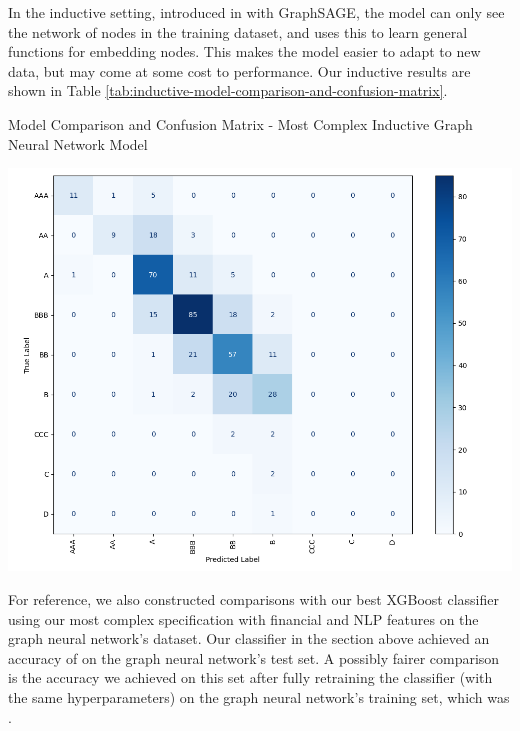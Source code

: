 \documentclass{article}[11pt]
\begin{document}
    In the inductive setting, introduced in \citep{hamilton_inductive_2018} with GraphSAGE, the model can only see the network of nodes in the training dataset, and uses this to learn general functions for embedding nodes. This makes the model easier to adapt to new data, but may come at some cost to performance. Our inductive results are shown in Table \ref{tab:inductive-model-comparison-and-confusion-matrix}.

    \begin{table}[h!]
        \centering
        \caption{Model Comparison and Confusion Matrix - Most Complex Inductive Graph Neural Network Model}
        \begin{minipage}[c]{0.495\linewidth}
            \centering
            
        \end{minipage}
        \begin{minipage}[c]{0.495\linewidth}
            \centering
            \includegraphics[width=0.95\hsize]{../Output/Modelling/Graph Neural Network/Inductive/confusion_matrix_no_title.png}
        \end{minipage}
        \label{tab:inductive-model-comparison-and-confusion-matrix}
    \end{table}

    For reference, we also constructed comparisons with our best XGBoost classifier using our most complex specification with financial and NLP features on the graph neural network's dataset. Our classifier in the section above achieved an accuracy of \pretrainedAccuracy \space on the graph neural network's test set. A possibly fairer comparison is the accuracy we achieved on this set after fully retraining the classifier (with the same hyperparameters) on the graph neural network's training set, which was \retrainAccuracy.
\end{document}
